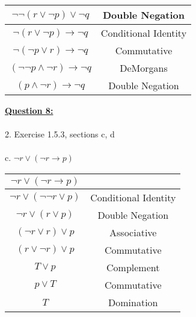 \documentclass[11pt]{article}
\begin{document}
{\begin{center}
\begin{tabular}{ |c|c| }
\hline
${\displaystyle \neg} {\displaystyle \neg} (r  \vee  {\displaystyle \neg} p) \vee {\displaystyle \neg} q$ & Double Negation\\
 \hline
$ {\displaystyle \neg} (r  \vee  {\displaystyle \neg} p) \rightarrow {\displaystyle \neg} q$ & Conditional Identity\\
 \hline
$ {\displaystyle \neg} ({\displaystyle \neg} p \vee r ) \rightarrow {\displaystyle \neg} q$ & Commutative\\
 \hline
 $ ({\displaystyle \neg}{\displaystyle \neg} p \wedge {\displaystyle \neg} r ) \rightarrow {\displaystyle \neg} q$ & DeMorgans\\
 \hline
  $ (p \wedge {\displaystyle \neg} r ) \rightarrow {\displaystyle \neg} q$ & Double Negation\\
 \hline
\end{tabular}
\end{center}

\pagebreak  
\noindent \textbf{\ul{Question 8:}} \\\\
2. Exercise 1.5.3, sections c, d \\\\
c. ${\displaystyle \neg} r \vee ( {\displaystyle \neg} r \rightarrow p) $\\
\begin{center}
\begin{tabular}{ |c|c| } 
 \hline
${\displaystyle \neg} r \vee ( {\displaystyle \neg} r \rightarrow p) $ & \space \\
 \hline
${\displaystyle \neg} r \vee ( {\displaystyle \neg}{\displaystyle \neg} r \vee p) $ & Conditional Identity\\
 \hline
${\displaystyle \neg} r \vee (r \vee p) $& Double Negation \\
 \hline
$({\displaystyle \neg} r \vee r) \vee p $& Associative\\
\hline
$(r \vee {\displaystyle \neg} r) \vee p $& Commutative\\
\hline
$T \vee p $&Complement\\
 \hline
$p \vee T $& Commutative\\
 \hline
$ T $ & Domination\\
 \hline


\end{tabular}
\end{center}}
\end{document}

